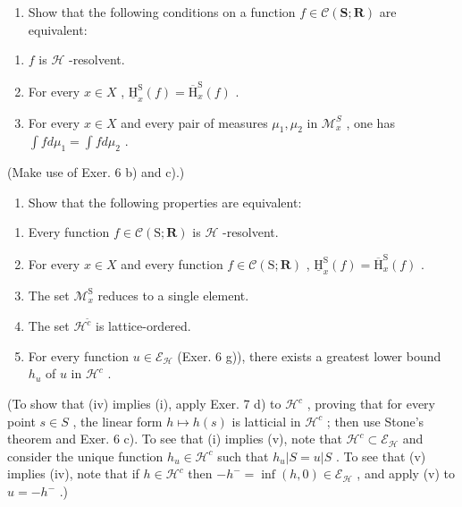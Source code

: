 \begin{enumerate}
\def\labelenumi{\alph{enumi})}
\tightlist
\item
  Show that the following conditions on a function \(f \in \mathcal{C}(\mathbf{S};\mathbf{R})\) are equivalent:
\end{enumerate}

\begin{enumerate}
\def\labelenumi{(\roman{enumi})}
\item
  \(f\) is \(\mathcal{H}\) -resolvent.
\item
  For every \(x \in X\) , \(\underline{\mathrm{H}}_x^{\mathrm{S}}(f) = \overline{\mathrm{H}}_x^{\mathrm{S}}(f)\) .
\item
  For every \(x \in X\) and every pair of measures \(\mu_1, \mu_2\) in \(\mathcal{M}_x^S\) , one has \(\int f d\mu_1 = \int f d\mu_2\) .
\end{enumerate}

(Make use of Exer. 6 b) and c).)

\begin{enumerate}
\def\labelenumi{\alph{enumi})}
\setcounter{enumi}{1}
\tightlist
\item
  Show that the following properties are equivalent:
\end{enumerate}

\begin{enumerate}
\def\labelenumi{(\roman{enumi})}
\item
  Every function \(f \in \mathcal{C}(\mathrm{S};\mathbf{R})\) is \(\mathcal{H}\) -resolvent.
\item
  For every \(x \in X\) and every function \(f \in \mathcal{C}(\mathrm{S};\mathbf{R})\) , \(\underline{\mathrm{H}}_x^{\mathrm{S}}(f) = \overline{\mathrm{H}}_x^{\mathrm{S}}(f)\) .
\item
  The set \(\mathcal{M}_x^{\mathrm{S}}\) reduces to a single element.
\item
  The set \(\mathcal{H}^{\tilde{c}}\) is lattice-ordered.
\item
  For every function \(u \in \mathcal{E}_{\mathcal{H}}\) (Exer. 6 g)), there exists a greatest lower bound \(h_u\) of \(u\) in \(\mathcal{H}^c\) .
\end{enumerate}

(To show that (iv) implies (i), apply Exer. 7 d) to \(\mathcal{H}^c\) , proving that for every point \(s \in S\) , the linear form \(h \mapsto h(s)\) is latticial in \(\mathcal{H}^c\) ; then use Stone's theorem and Exer. 6 c). To see that (i) implies (v), note that \(\mathcal{H}^c \subset \mathcal{E}_{\mathcal{H}}\) and consider the unique function \(h_u \in \mathcal{H}^c\) such that \(h_u|S = u|S\) . To see that (v) implies (iv), note that if \(h \in \mathcal{H}^c\) then \(-h^{-} = \inf(h,0) \in \mathcal{E}_{\mathcal{H}}\) , and apply (v) to \(u = -h^{-}\) .)

